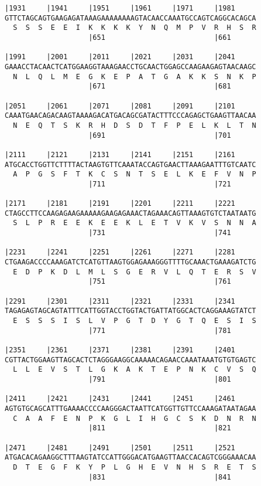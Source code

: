 \documentclass{article}
\begin{document}
\begin{Verbatim}
|1931     |1941     |1951     |1961     |1971     |1981     
GTTCTAGCAGTGAAGAGATAAAGAAAAAAAAGTACAACCAAATGCCAGTCAGGCACAGCA
  S  S  S  E  E  I  K  K  K  K  Y  N  Q  M  P  V  R  H  S  R
                    |651                          |661      
  
|1991     |2001     |2011     |2021     |2031     |2041     
GAAACCTACAACTCATGGAAGGTAAAGAACCTGCAACTGGAGCCAAGAAGAGTAACAAGC
  N  L  Q  L  M  E  G  K  E  P  A  T  G  A  K  K  S  N  K  P
                    |671                          |681      
  
|2051     |2061     |2071     |2081     |2091     |2101     
CAAATGAACAGACAAGTAAAAGACATGACAGCGATACTTTCCCAGAGCTGAAGTTAACAA
  N  E  Q  T  S  K  R  H  D  S  D  T  F  P  E  L  K  L  T  N
                    |691                          |701      
  
|2111     |2121     |2131     |2141     |2151     |2161     
ATGCACCTGGTTCTTTTACTAAGTGTTCAAATACCAGTGAACTTAAAGAATTTGTCAATC
  A  P  G  S  F  T  K  C  S  N  T  S  E  L  K  E  F  V  N  P
                    |711                          |721      
  
|2171     |2181     |2191     |2201     |2211     |2221     
CTAGCCTTCCAAGAGAAGAAAAAGAAGAGAAACTAGAAACAGTTAAAGTGTCTAATAATG
  S  L  P  R  E  E  K  E  E  K  L  E  T  V  K  V  S  N  N  A
                    |731                          |741      
  
|2231     |2241     |2251     |2261     |2271     |2281     
CTGAAGACCCCAAAGATCTCATGTTAAGTGGAGAAAGGGTTTTGCAAACTGAAAGATCTG
  E  D  P  K  D  L  M  L  S  G  E  R  V  L  Q  T  E  R  S  V
                    |751                          |761      
  
|2291     |2301     |2311     |2321     |2331     |2341     
TAGAGAGTAGCAGTATTTCATTGGTACCTGGTACTGATTATGGCACTCAGGAAAGTATCT
  E  S  S  S  I  S  L  V  P  G  T  D  Y  G  T  Q  E  S  I  S
                    |771                          |781      
  
|2351     |2361     |2371     |2381     |2391     |2401     
CGTTACTGGAAGTTAGCACTCTAGGGAAGGCAAAAACAGAACCAAATAAATGTGTGAGTC
  L  L  E  V  S  T  L  G  K  A  K  T  E  P  N  K  C  V  S  Q
                    |791                          |801      
  
|2411     |2421     |2431     |2441     |2451     |2461     
AGTGTGCAGCATTTGAAAACCCCAAGGGACTAATTCATGGTTGTTCCAAAGATAATAGAA
  C  A  A  F  E  N  P  K  G  L  I  H  G  C  S  K  D  N  R  N
                    |811                          |821      
  
|2471     |2481     |2491     |2501     |2511     |2521     
ATGACACAGAAGGCTTTAAGTATCCATTGGGACATGAAGTTAACCACAGTCGGGAAACAA
  D  T  E  G  F  K  Y  P  L  G  H  E  V  N  H  S  R  E  T  S
                    |831                          |841      
  

\end{Verbatim}
\end{document}
